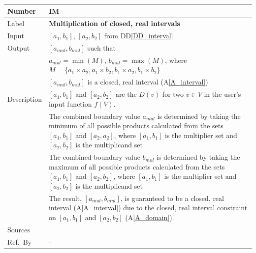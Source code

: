\documentclass[12pt]{article}
\newcommand{\colAwidth}{0.13\textwidth}
\newcommand{\colBwidth}{0.82\textwidth}
\newcommand{\ddref}[1]{DD\ref{#1}}
\newcommand{\aref}[1]{A\ref{#1}}
\newcounter{instnum} %
\begin{document}
\noindent
\begin{minipage}{\textwidth}
	\renewcommand*{\arraystretch}{1.5}
	\begin{tabular}{| p{\colAwidth} | p{\colBwidth}|}
		\hline
		\rowcolor[gray]{0.9}
		Number& IM{instnum}\theinstnum \label{I_multiplication}\\
		\hline
		Label& \bf Multiplication of closed, real intervals\\
		\hline
		Input&$[a_{1}, b_{1}]$, $[a_{2}, b_{2}]$ from \ddref{DD_interval}\\
		\hline
		Output&$[a_{mul}, b_{mul}]$ such that\\
		&$a_{mul} = \min(M)$, $b_{mul} = \max(M)$, where $M = \{a_{1} \times 
		a_{2}, a_{1} \times b_{2}, b_{1} \times a_{2}, b_{1} \times b_{2}\}$\\
		&$[a_{mul}, b_{mul}]$ is a closed, real interval (\aref{A_interval}) \\
		\hline
		Description&$[a_{1}, b_{1}]$ and $[a_{2}, b_{2}]$ are the $D(v)$ for 
		two $v \in V$ in the user's input function $f(V)$. \\
		&The combined boundary value $a_{mul}$ is determined by taking the 
		minimum of all possible products calculated from the sets $[a_{1}, 
		b_{1}]$ and $[a_{2}, a_{2}]$, where $[a_{1}, b_{1}]$ is the 
		multiplier set and $[a_{2}, b_{2}]$ is the multiplicand set\\
		&The combined boundary value $b_{mul}$ is determined by taking the 
		maximum of all possible products calculated from the sets $[a_{1}, 
		b_{1}]$ and $[a_{2}, b_{2}]$, where $[a_{1}, b_{1}]$ is the 
		multiplier set and $[a_{2}, b_{2}]$ is the multiplicand set\\
		& The result, $[a_{mul}, b_{mul}]$, is guaranteed to be a closed, real 
		interval (\aref{A_interval}) due to the closed, real interval 
		constraint on $[a_{1}, b_{1}]$ and $[a_{2}, b_{2}]$ (\aref{A_domain}).
		\\
		\hline
		Sources& ~\cite{intervalarithmetic} \ \\
		\hline
		Ref.\ By & -\\
		\hline
	\end{tabular}
\end{minipage}\\

~\newline
\end{document}
